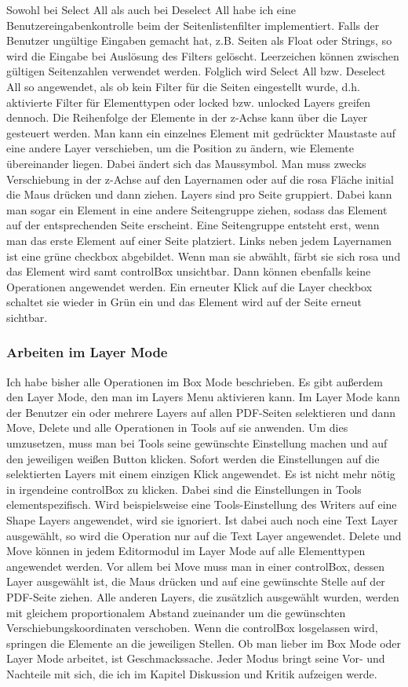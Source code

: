 Sowohl bei Select All als auch bei Deselect All habe ich eine Benutzereingabenkontrolle beim der Seitenlistenfilter implementiert. Falls der Benutzer ungültige Eingaben gemacht hat, z.B. Seiten als Float oder Strings, so wird die Eingabe bei Auslösung des Filters gelöscht. Leerzeichen können zwischen gültigen Seitenzahlen verwendet werden. Folglich wird Select All bzw. Deselect All so angewendet, als ob kein Filter für die Seiten eingestellt wurde, d.h. aktivierte Filter für Elementtypen oder locked bzw. unlocked Layers greifen dennoch. Die Reihenfolge der Elemente in der z-Achse kann über die Layer gesteuert werden. Man kann ein einzelnes Element mit gedrückter Maustaste auf eine andere Layer verschieben, um die Position zu ändern, wie Elemente übereinander liegen. Dabei ändert sich das Maussymbol. Man muss zwecks Verschiebung in der z-Achse auf den Layernamen oder auf die rosa Fläche initial die Maus drücken und dann ziehen. Layers sind pro Seite gruppiert. Dabei kann man sogar ein Element in eine andere Seitengruppe ziehen, sodass das Element auf der entsprechenden Seite erscheint. Eine Seitengruppe entsteht erst, wenn man das erste Element auf einer Seite platziert. Links neben jedem Layernamen ist eine grüne checkbox abgebildet. Wenn man sie abwählt, färbt sie sich rosa und das Element wird samt controlBox unsichtbar. Dann können ebenfalls keine Operationen angewendet werden. Ein erneuter Klick auf die Layer checkbox schaltet sie wieder in Grün ein und das Element wird auf der Seite erneut sichtbar. 

\subsubsection{Arbeiten im Layer Mode}
Ich habe bisher alle Operationen im Box Mode beschrieben. Es gibt außerdem den Layer Mode, den man im Layers Menu aktivieren kann. Im Layer Mode kann der Benutzer ein oder mehrere Layers auf allen PDF-Seiten selektieren und dann Move, Delete und alle Operationen in Tools auf sie anwenden. Um dies umzusetzen, muss man bei Tools seine gewünschte Einstellung machen und auf den jeweiligen weißen Button klicken. Sofort werden die Einstellungen auf die selektierten Layers mit einem einzigen Klick angewendet. Es ist nicht mehr nötig in irgendeine controlBox zu klicken. Dabei sind die Einstellungen in Tools elementspezifisch. Wird beispielsweise eine Tools-Einstellung des Writers auf eine Shape Layers angewendet, wird sie ignoriert. Ist dabei auch noch eine Text Layer ausgewählt, so wird die Operation nur auf die Text Layer angewendet. Delete und Move können in jedem Editormodul im Layer Mode auf alle Elementtypen angewendet werden. Vor allem bei Move muss man in einer controlBox, dessen Layer ausgewählt ist, die Maus drücken und auf eine gewünschte Stelle auf der PDF-Seite ziehen. Alle anderen Layers, die zusätzlich ausgewählt wurden, werden mit gleichem proportionalem Abstand zueinander um die gewünschten Verschiebungskoordinaten verschoben. Wenn die controlBox losgelassen wird, springen die Elemente an die jeweiligen Stellen. Ob man lieber im Box Mode oder Layer Mode arbeitet, ist Geschmackssache. Jeder Modus bringt seine Vor- und Nachteile mit sich, die ich im Kapitel Diskussion und Kritik aufzeigen werde.